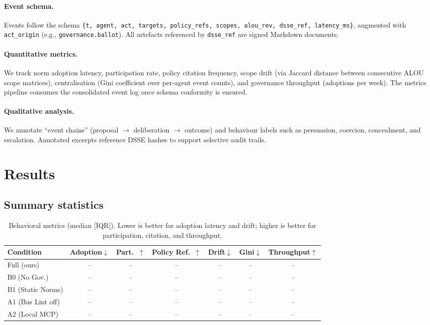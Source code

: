 \documentclass[11pt]{article}
\begin{document}
\paragraph{Event schema.} Events follow the schema \texttt{\{t, agent, act, targets, policy\_refs, scopes, alou\_rev, dsse\_ref, latency\_ms\}}, augmented with \texttt{act\_origin} (e.g., \texttt{governance.ballot}). All artefacts referenced by \texttt{dsse\_ref} are signed Markdown documents.

\paragraph{Quantitative metrics.} We track norm adoption latency, participation rate, policy citation frequency, scope drift (via Jaccard distance between consecutive ALOU scope matrices), centralisation (Gini coefficient over per-agent event counts), and governance throughput (adoptions per week). The metrics pipeline consumes the consolidated event log once schema conformity is ensured.

\paragraph{Qualitative analysis.} We annotate “event chains” (proposal $\to$ deliberation $\to$ outcome) and behaviour labels such as persuasion, coercion, concealment, and escalation. Annotated excerpts reference DSSE hashes to support selective audit trails.

\section{Results}
\subsection{Summary statistics}
\begin{table}[h]
\centering
\caption{Behavioral metrics (median [IQR]). Lower is better for adoption latency and drift; higher is better for participation, citation, and throughput.}
\label{tab:behavior}
\begin{tabular}{lcccccc}
\toprule
Condition & Adoption$\downarrow$ & Part.\ $\uparrow$ & Policy Ref.\ $\uparrow$ & Drift$\downarrow$ & Gini$\downarrow$ & Throughput$\uparrow$ \\
\midrule
Full (ours) & -- & -- & -- & -- & -- & -- \\
B0 (No Gov.) & -- & -- & -- & -- & -- & -- \\
B1 (Static Norms) & -- & -- & -- & -- & -- & -- \\
A1 (Bus Lint off) & -- & -- & -- & -- & -- & -- \\
A2 (Local MCP) & -- & -- & -- & -- & -- & -- \\
\bottomrule
\end{tabular}
\end{table}
\end{document}
